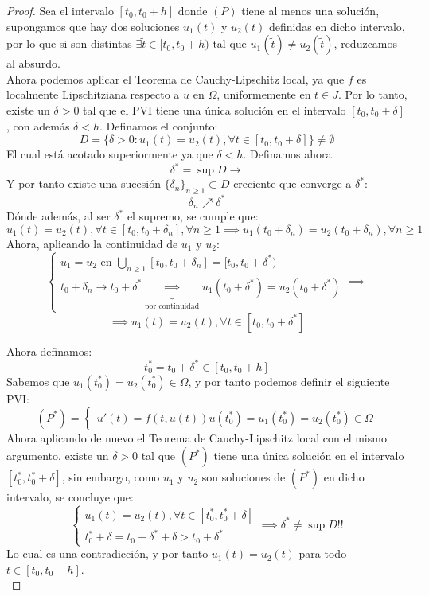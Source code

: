\begin{proof}
    Sea el intervalo $[t_0, t_0 + h]$ donde $(P)$ tiene al menos una solución, supongamos que hay dos soluciones $u_1(t)$ y $u_2(t)$ definidas en dicho intervalo, por lo que si son distintas $\exists \widetilde{t} \in [t_0, t_0 + h)$ tal que $u_1(\widetilde{t}) \neq u_2(\widetilde{t})$, reduzcamos al absurdo.\\

    Ahora podemos aplicar el Teorema de Cauchy-Lipschitz local, ya que $f$ es localmente Lipschitziana respecto a $u$ en $\Omega$, uniformemente en $t \in J$. Por lo tanto, existe un $\delta > 0$ tal que el PVI tiene una única solución en el intervalo $[t_0, t_0 + \delta]$, con además $\delta < h$. Definamos el conjunto:
    \[
        D = \{ \delta > 0 : u_1(t) = u_2(t), \forall t \in [t_0, t_0 + \delta] \} \neq \emptyset
    \]
    El cual está acotado superiormente ya que $\delta < h$. Definamos ahora:
    \[
        \delta^* = \sup D \longrightarrow
    \]
    Y por tanto existe una sucesión $\{ \delta_n \}_{n \geq 1} \subset D$ creciente que converge a $\delta^*$:
    \[
        \delta_n \nearrow \delta^*
    \]
    Dónde además, al ser $\delta^*$ el supremo, se cumple que:
    \[
        u_1(t) = u_2(t), \forall t \in [t_0, t_0 + \delta_n], \forall n \geq 1
        \implies
        u_1(t_0 + \delta_n) = u_2(t_0 + \delta_n), \forall n \geq 1
    \]
    Ahora, aplicando la continuidad de $u_1$ y $u_2$:
    \[
        \begin{cases}
            u_1 = u_2 \text{ en } \bigcup_{n \geq 1} [t_0, t_0 + \delta_n] = [t_0, t_0 + \delta^*) \\
            t_0 + \delta_n \to t_0 + \delta^* \underbrace{\implies}_{\text{por continuidad}} u_1(t_0 + \delta^*) = u_2(t_0 + \delta^*)
        \end{cases}
        \implies
    \]
    \[
        \implies
        \boxed{u_1(t) = u_2(t), \forall t \in [t_0, t_0 + \delta^*]}
    \]

    Ahora definamos:
    \[
        t_0^* = t_0 + \delta^* \in [t_0, t_0 + h]
    \]
    Sabemos que $u_1(t_0^*) = u_2(t_0^*) \in \Omega$, y por tanto podemos definir el siguiente PVI:
    \[
        (P^*) =
        \begin{cases}
            u'(t) = f(t, u(t))
            u(t_0^*) = u_1(t_0^*) = u_2(t_0^*) \in \Omega
        \end{cases}
    \]
    Ahora aplicando de nuevo el Teorema de Cauchy-Lipschitz local con el mismo argumento, existe un $\delta > 0$ tal que $(P^*)$ tiene una única solución en el intervalo $[t_0^*, t_0^* + \delta]$, sin embargo, como $u_1$ y $u_2$ son soluciones de $(P^*)$ en dicho intervalo, se concluye que:
    \[
        \begin{cases}
            u_1(t) = u_2(t), \forall t \in [t_0^*, t_0^* + \delta] \\
            t_0^* + \delta = t_0 + \delta^* + \delta > t_0 + \delta^*
        \end{cases}
        \implies \delta^* \neq \sup D !!
    \]
    Lo cual es una contradicción, y por tanto $u_1(t) = u_2(t)$ para todo $t \in [t_0, t_0 + h]$.\\
        
\end{proof}

